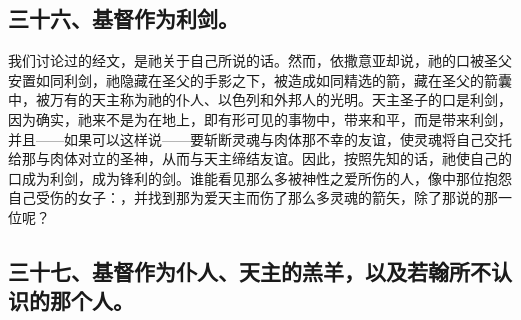 
\subsection{三十六、基督作为利剑。}

我们讨论过的经文，是祂关于自己所说的话。然而，依撒意亚却说，祂的口被圣父安置如同利剑，祂隐藏在圣父的手影之下，被造成如同精选的箭，藏在圣父的箭囊中，被万有的天主称为祂的仆人、以色列和外邦人的光明。天主圣子的口是利剑，因为确实，祂来不是为在地上，即有形可见的事物中，带来和平，而是带来利剑，并且——如果可以这样说——要斩断灵魂与肉体那不幸的友谊，使灵魂将自己交托给那与肉体对立的圣神，从而与天主缔结友谊。因此，按照先知的话，祂使自己的口成为利剑，成为锋利的剑。谁能看见那么多被神性之爱所伤的人，像中那位抱怨自己受伤的女子：，并找到那为爱天主而伤了那么多灵魂的箭矢，除了那说的那一位呢？\par


\subsection{三十七、基督作为仆人、天主的羔羊，以及若翰所不认识的那个人。}

